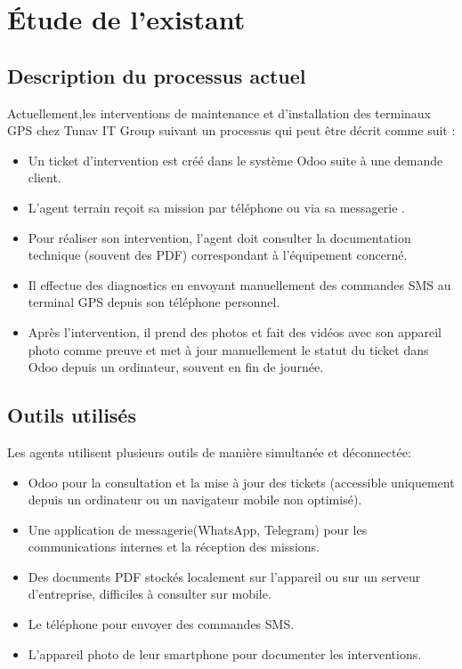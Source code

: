 \documentclass[12pt,a4paper]{report}
\begin{document}
\section{Étude de l'existant}
\subsection{Description du processus actuel}
\noindent Actuellement,les interventions de maintenance et d'installation des terminaux GPS chez Tunav IT Group suivant un processus qui peut être décrit comme suit :
\begin{itemize}
    \item Un ticket d'intervention est créé dans le système Odoo suite à une demande client.
    \item L'agent terrain reçoit sa mission par téléphone ou via sa messagerie .
    \item Pour réaliser son intervention, l'agent doit consulter la documentation technique (souvent des PDF) correspondant à l'équipement concerné.
    \item Il effectue des diagnostics en envoyant manuellement des commandes SMS au terminal GPS depuis son téléphone personnel.
    \item Après l'intervention, il prend des photos et fait des vidéos avec son appareil photo comme preuve et met à jour manuellement le statut du ticket dans Odoo depuis un ordinateur, souvent en fin de journée.
    \end{itemize}
    \subsection{Outils utilisés}
    \noindent Les agents utilisent plusieurs outils de manière simultanée et déconnectée:
    \begin{itemize}
        \item Odoo pour la consultation et la mise à jour des tickets (accessible uniquement depuis un ordinateur ou un navigateur mobile non optimisé).
        \item Une application de messagerie(WhatsApp, Telegram) pour les communications internes et la réception des missions.
        \item Des documents PDF stockés localement sur l'appareil ou sur un serveur d'entreprise, difficiles à consulter sur mobile.
        \item Le téléphone pour envoyer des commandes SMS.
        \item L'appareil photo de leur smartphone pour documenter les interventions.   
    \end{itemize}
\end{document}
